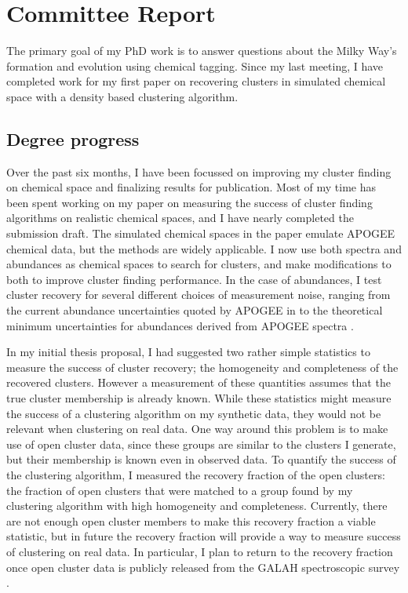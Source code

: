 \documentclass[11pt]{article}
\begin{document}
    
    \section*{Committee Report}
    
    The primary goal of my PhD work is to answer questions about the Milky Way's formation and evolution using chemical tagging. Since my last meeting, I have completed work for my first paper on recovering clusters in simulated chemical space with a density based clustering algorithm.    

    \subsection*{Degree progress}

	Over the past six months, I have been focussed on improving my cluster finding on chemical space and finalizing results for publication. Most of my time has been spent working on my paper on measuring the success of cluster finding algorithms on realistic chemical spaces, and I have nearly completed the submission draft. The simulated chemical spaces in the paper emulate APOGEE \citep{Majewski2017} chemical data, but the methods are widely applicable. I now use both spectra and abundances as chemical spaces to search for clusters, and make modifications to both to improve cluster finding performance. In the case of abundances, I test cluster recovery for several different choices of measurement noise, ranging from the current abundance uncertainties quoted by APOGEE in \citealt{DR14} to the theoretical minimum uncertainties for abundances derived from APOGEE spectra \citep{Ting}.
	
	In my initial thesis proposal, I had suggested two rather simple statistics to measure the success of cluster recovery; the homogeneity and completeness of the recovered clusters. However a measurement of these quantities assumes that the true cluster membership is already known. While these statistics might measure the success of a clustering algorithm on my synthetic data, they would not be relevant when clustering on real data. One way around this problem is to make use of open cluster data, since these groups are similar to the clusters I generate, but their membership is known even in observed data. To quantify the success of the clustering algorithm, I measured the recovery fraction of the open clusters: the fraction of open clusters that were matched to a group found by my clustering algorithm with high homogeneity and completeness. Currently, there are not enough open cluster members to make this recovery fraction a viable statistic, but in future the recovery fraction will provide a way to measure success of clustering on real data. In particular, I plan to return to the recovery fraction once open cluster data is publicly released from the GALAH spectroscopic survey \citep{galah}.
    
\end{document}
